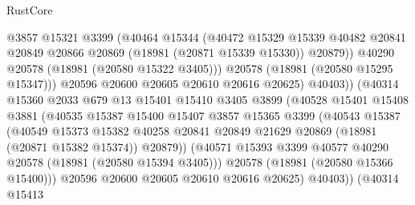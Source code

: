 \begin{lexlean}{RustCore}
\begin{coremodule}
                              @3857
                              @15321
                              @3399
                              (@40464
                                @15344
                                (@40472
                                  @15329
                                  @15339
                                  @40482
                                  @20841
                                  @20849
                                  @20866
                                  @20869
                                  (@18981 (@20871 @15339 @15330))
                                  @20879))
                              @40290
                              @20578
                              (@18981 (@20580 @15322 @3405)))
                            @20578
                            (@18981 (@20580 @15295 @15347)))
                          @20596
                          @20600
                          @20605
                          @20610
                          @20616
                          @20625)
                        @40403))
                    (@40314
                      @15360
                      @2033
                      @679
                      @13
                      @15401
                      @15410
                      @3405
                      @3899
                      (@40528
                        @15401
                        @15408
                        @3881
                        (@40535
                          @15387
                          @15400
                          @15407
                          @3857
                          @15365
                          @3399
                          (@40543
                            @15387
                            (@40549
                              @15373
                              @15382
                              @40258
                              @20841
                              @20849
                              @21629
                              @20869
                              (@18981 (@20871 @15382 @15374))
                              @20879))
                          (@40571 @15393 @3399 @40577 @40290 @20578 (@18981 (@20580 @15394 @3405)))
                          @20578
                          (@18981 (@20580 @15366 @15400)))
                        @20596
                        @20600
                        @20605
                        @20610
                        @20616
                        @20625)
                      @40403))
                  (@40314
                    @15413

\end{coremodule}
\end{lexlean}
